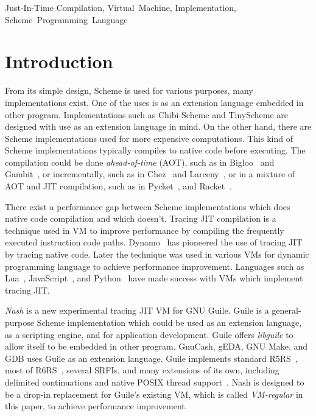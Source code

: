 \documentclass[preprint, 10pt]{sigplanconf}
\begin{document}
\keywords{} Just-In-Time Compilation, Virtual~Machine, Implementation,
Scheme~Programming~Language

\section{Introduction}

From its simple design, Scheme is used for various purposes, many
implementations exist. One of the uses is as an extension language embedded in
other program. Implementations such as Chibi-Scheme and TinyScheme are
designed with use as an extension language in mind. On the other hand, there
are Scheme implementations used for more expensive computations. This kind of
Scheme implementations typically compiles to native code before executing. The
compilation could be done \textit{ahead-of-time} (AOT), such as in
Bigloo~\cite{serrano1995bigloo} and Gambit~\cite{feeley1998gambit}, or
incrementally, such as in Chez~\cite{dybvig2006development} and
Larceny~\cite{hansen1992impact}, or in a mixture of AOT and JIT compilation,
such as in Pycket~\cite{bauman2015pycket}, and Racket~\cite{flatt2013racket}.

There exist a performance gap between Scheme implementations which does native
code compilation and which doesn't. Tracing JIT compilation is a technique
used in VM to improve performance by compiling the frequently executed
instruction code paths. Dynamo~\cite{bala2000dynamo} has pioneered the use of
tracing JIT by tracing native code. Later the technique was used in various
VMs for dynamic programming language to achieve performance
improvement. Languages such as Lua~\cite{pall2016luajit},
JavaScript~\cite{gal2009trace}, and Python~\cite{bolz2009tracing} have made
success with VMs which implement tracing JIT.\@

\textit{Nash} is a new experimental tracing JIT VM for GNU Guile. Guile is a
general-purpose Scheme implementation which could be used as an extension
language, as a scripting engine, and for application development. Guile offers
\textit{libguile} to allow itself to be embedded in other program. GnuCash,
gEDA, GNU Make, and GDB uses Guile as an extension language. Guile implements
standard R5RS~\cite{abelson1998revised5}, most of
R6RS~\cite{sperber2010revised}, several SRFIs, and many extensions of its own,
including delimited continuations and native POSIX thread
support~\cite{Galassi02guilereference}. Nash is designed to be a drop-in
replacement for Guile's existing VM, which is called \textit{VM-regular} in
this paper, to achieve performance improvement.
\end{document}

